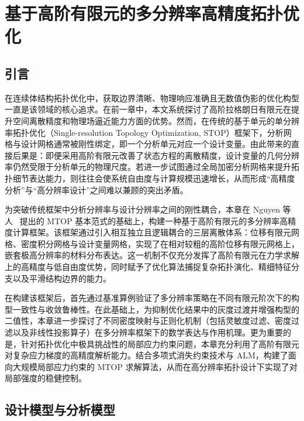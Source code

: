 \chapter{基于高阶有限元的多分辨率高精度拓扑优化}
\label{chap:high_fem_mtop}
 

\section{引言}
\label{sec:ch4_intro}

在连续体结构拓扑优化中，获取边界清晰、物理响应准确且无数值伪影的优化构型一直是该领域的核心追求。在前一章中，本文系统探讨了高阶拉格朗日有限元在提升空间离散精度和物理场逼近能力方面的优势。然而，在传统的基于单元的单分辨率拓扑优化（Single-resolution Topology Optimization, STOP）框架下，分析网格与设计网格通常被刚性绑定，即一个分析单元对应一个设计变量。由此带来的直接后果是：即便采用高阶有限元改善了状态方程的离散精度，设计变量的几何分辨率仍然受限于分析单元的物理尺度。若进一步试图通过全局加密分析网格来提升拓扑细节表达能力，则往往会使系统自由度与计算规模迅速增长，从而形成“高精度分析”与“高分辨率设计”之间难以兼顾的突出矛盾。

为突破传统框架中分析分辨率与设计分辨率之间的刚性耦合，本章在 Nguyen 等人~\cite{nguyenComputationalParadigmMultiresolution2010a} 提出的 MTOP 基本范式的基础上，构建一种基于高阶有限元的多分辨率高精度计算框架。该框架通过引入相互独立且逻辑耦合的三层离散体系：位移有限元网格、密度积分网格与设计变量网格，实现了在相对较粗的高阶位移有限元网格上，嵌套极高分辨率的材料分布表达。这一机制不仅充分发挥了高阶有限元在力学求解上的高精度与低自由度优势，同时赋予了优化算法捕捉复杂拓扑演化、精细特征分支以及平滑结构边界的能力。

在构建该框架后，首先通过基准算例验证了多分辨率策略在不同有限元阶次下的构型一致性与收敛鲁棒性。在此基础上，为抑制优化结果中的灰度过渡并增强构型的二值性，本章进一步探讨了不同密度映射与正则化机制（包括灵敏度过滤、密度过滤以及非线性投影算子）在多分辨率框架下的数学表达与作用机理。更为重要的是，针对拓扑优化中极具挑战性的局部应力约束问题，本章充分利用了高阶有限元对复杂应力梯度的高精度解析能力。结合多项式消失约束技术与 ALM，构建了面向大规模局部应力约束的 MTOP 求解算法，从而在高分辨率拓扑设计下实现了对局部强度的稳健控制。


\section{设计模型与分析模型}
\label{sec:design_analysis_model}

